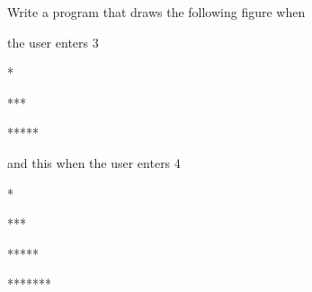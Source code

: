 Write a program that draws the following figure when

the user enters 3

\begin{console}

  *

 ***

*****

\end{console}

and this when the user enters 4

\begin{console}

   *

  ***

 *****

*******

\end{console}


